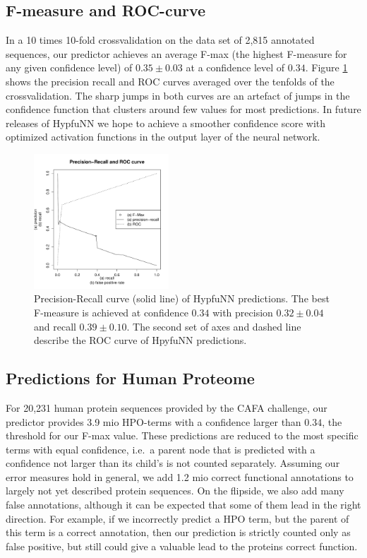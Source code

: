 \subsection*{F-measure and ROC-curve}
In a 10 times 10-fold crossvalidation on the data set of 2,815 annotated sequences, our predictor achieves an average F-max (the highest F-measure for any given confidence level) of $0.35\pm 0.03$ at a confidence level of $0.34$. Figure \ref{img:preRec_ROC} shows the precision recall and ROC curves averaged over the tenfolds of the crossvalidation. The sharp jumps in both curves are an artefact of jumps in the confidence function that clusters around few values for most predictions. In future releases of HypfuNN we hope to achieve a smoother confidence score with optimized activation functions in the output layer of the neural network.

\begin{figure}[!h]
\includegraphics[width=0.45\textwidth]{figures/PreRecROC.pdf}
\caption{Precision-Recall curve (solid line) of HypfuNN predictions. The best F-measure is achieved at confidence $0.34$ with precision $0.32 \pm 0.04$ and recall $0.39 \pm 0.10$. The second set of axes and dashed line describe the ROC curve of HpyfuNN predictions.}
\label{img:preRec_ROC}
\end{figure}

\subsection*{Predictions for Human Proteome}

For 20,231 human protein sequences provided by the CAFA challenge, our predictor provides 3.9 mio HPO-terms with a confidence larger than $0.34$, the threshold for our F-max value. These predictions are reduced to the most specific terms with equal confidence, i.e.~a parent node that is predicted with a confidence not larger than its child's is not counted separately. Assuming our error measures hold in general, we add 1.2 mio correct functional annotations to largely not yet described protein sequences. On the flipside, we also add many false annotations, although it can be expected that some of them lead in the right direction. For example, if we incorrectly predict a HPO term, but the parent of this term is a correct annotation, then our prediction is strictly counted only as false positive, but still could give a valuable lead to the proteins correct function.